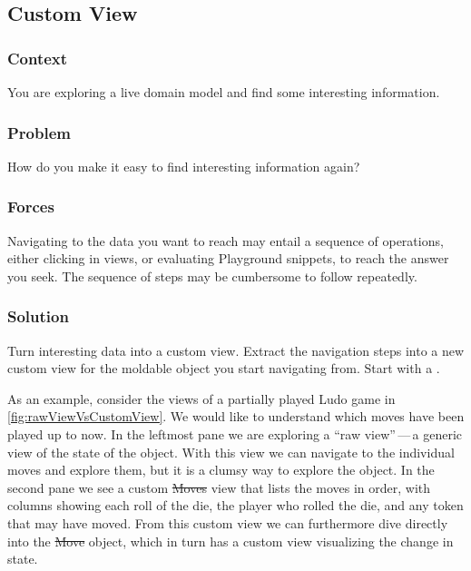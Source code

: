 \documentclass[sigconf]{acmart}
\renewcommand{\nbc}[3]{} %
\newcommand\on[1]{\nbc{ON}{#1}{olive}} %
\newcommand\eog[1]{\nbc{Edward}{#1}{purple}}
\newcommand{\pattern}[1]{\emph{\nameref{pat:#1}}\xspace}
\begin{document}
\subsection*{Custom View}\label{pat:customView}
\subsubsection*{Context}
You are exploring a live domain model and find some interesting information.

\subsubsection*{Problem}
How do you make it easy to find interesting information again?

\subsubsection*{Forces}
Navigating to the data you want to reach may entail a sequence of operations, either clicking in views, or evaluating Playground snippets, to reach the answer you seek.
The sequence of steps may be cumbersome to follow repeatedly.

\eog{this part here, you could describe it also with like a watch statement in javascript or whatever, like this kind of thing.
And then people could be more familiar with that because they, they do that.}

\subsubsection*{Solution}
Turn interesting data into a custom view.
Extract the navigation steps into a new custom view for the moldable object you start navigating from.
Start with a \pattern{simpleView}.

\eog{I'd love to see maybe a picture like a figure with this.}

As an example, consider the views of a partially played Ludo game in \autoref{fig:rawViewVsCustomView}.
We would like to understand which moves have been played up to now.
In the leftmost pane we are exploring a ``raw view''\,---\,a generic view of the state of the object.
With this view we can navigate to the individual moves and explore them, but it is a clumsy way to explore the object.
In the second pane we see a custom \st{Moves} view that lists the moves in order, with columns showing each roll of the die, the player who rolled the die, and any token that may have moved.
From this custom view we can furthermore dive directly into the \st{Move} object, which in turn has a custom view visualizing the change in state.
\end{document}
